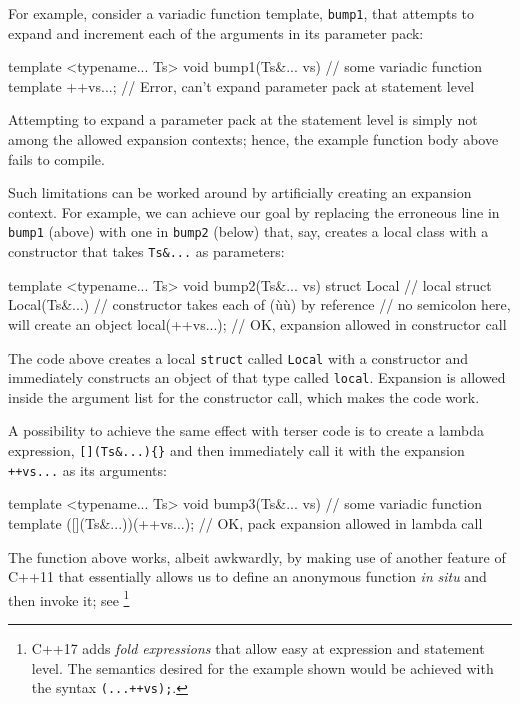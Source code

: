 For example, consider a variadic function template, \lstinline!bump1!, that
attempts to expand and increment each of the arguments in its parameter
pack:

\begin{emcppslisting}
template <typename... Ts>
void bump1(Ts&... vs)  // some variadic function template
{
    ++vs...;           // Error, can't expand parameter pack at statement level
}
\end{emcppslisting}
    

\noindent Attempting to expand a parameter pack at the statement level is simply
not among the allowed expansion contexts; hence, the example function
body above fails to compile.

Such limitations can be worked around by artificially creating an
expansion context. For example, we can achieve our goal by replacing the
erroneous line in \lstinline!bump1! (above) with one in \lstinline!bump2!
(below) that, say, creates a local class with a constructor that takes
\lstinline!Ts&...! as parameters:

\begin{emcppslisting}
template <typename... Ts>
void bump2(Ts&... vs)
{
    struct Local          // local struct
    {
        Local(Ts&...) {}  // constructor takes each of (ù{}ù) by reference
    }                     // no semicolon here, will create an object
    local(++vs...);       // OK, expansion allowed in constructor call
}
\end{emcppslisting}
    

\noindent The code above creates a local \lstinline!struct! called \lstinline!Local!
with a constructor and immediately constructs an object of that type
called \lstinline!local!. Expansion is allowed inside the argument list for
the constructor call, which makes the code work.

A possibility to achieve the same effect with terser code is to create a
lambda expression, \lstinline![](Ts&...){}! and then immediately call it
with the expansion \lstinline!++vs...! as its arguments:

\begin{emcppslisting}
template <typename... Ts>
void bump3(Ts&... vs)          // some variadic function template
{
     ([](Ts&...){})(++vs...);  // OK, pack expansion allowed in lambda call
}
\end{emcppslisting}
    

\noindent The function above works, albeit awkwardly, by making use of another
feature of C++11 that essentially allows us to define an anonymous
function \emph{in} \emph{situ} and then invoke it; see
{\cprotect\footnote{C++17 adds \emph{fold expressions} that allow easy 
  at expression and statement level. The semantics desired for the
  example shown would be achieved with the syntax \lstinline!(...++vs);!.}}

